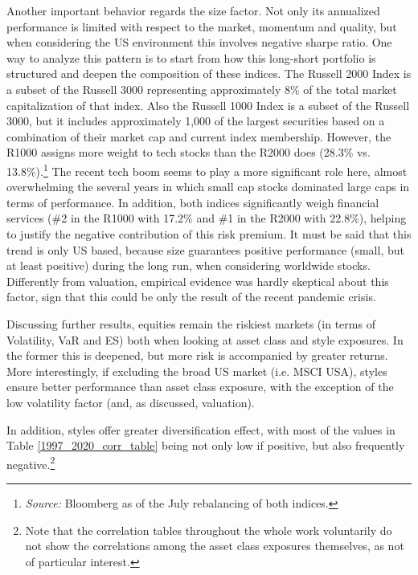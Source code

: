 \documentclass[12pt]{article}
\begin{document}
Another important behavior regards the size factor. Not only its annualized performance is limited with respect to the market, momentum and quality, but when considering the US environment this involves negative sharpe ratio. One way to analyze this pattern is to start from how this long-short portfolio is structured and deepen the composition of these indices. The Russell 2000 Index is a subset of the Russell 3000 representing approximately 8\% of the total market capitalization of that index. Also the Russell 1000 Index is a subset of the Russell 3000, but it includes approximately 1,000 of the largest securities based on a combination of their market cap and current index membership. However, the R1000 assigns more weight to tech stocks than the R2000 does (28.3\% vs. 13.8\%).\footnote{\textit{Source:} Bloomberg as of the July rebalancing of both indices.} The recent tech boom seems to play a more significant role here, almost overwhelming the several years in which small cap stocks dominated large caps in terms of performance. In addition, both indices significantly weigh financial services (\#2 in the R1000 with 17.2\% and \#1 in the R2000 with 22.8\%), helping to justify the negative contribution of this risk premium. It must be said that this trend is only US based, because size guarantees positive performance (small, but at least positive) during the long run, when considering worldwide stocks. Differently from valuation, empirical evidence was hardly skeptical about this factor, sign that this could be only the result of the recent pandemic crisis.

Discussing further results, equities remain the riskiest markets (in terms of Volatility, VaR and ES) both when looking at asset class and style exposures. In the former this is deepened, but more risk is accompanied by greater returns. More interestingly, if excluding the broad US market (i.e. MSCI USA), styles ensure better performance than asset class exposure, with the exception of the low volatility factor (and, as discussed, valuation).   

In addition, styles offer greater diversification effect, with most of the values in Table \ref{1997_2020_corr_table} being not only low if positive, but also frequently negative.\footnote{Note that the correlation tables throughout the whole work voluntarily do not show the correlations among the asset class exposures themselves, as not of particular interest.}
\end{document}
